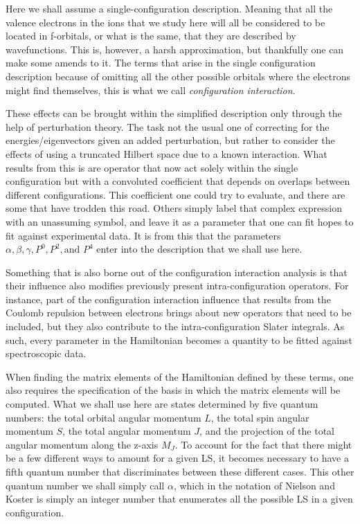 \documentclass{article}
\begin{document}
\begin{multicols}{2}
Here we shall assume a single-configuration description. Meaning that all the valence electrons in the ions that we study here will all be considered to be located in f-orbitals, or what is the same, that they are described by \fn wavefunctions. This is, however, a harsh approximation, but thankfully one can make some amends to it. The terms that arise in the single configuration description because of omitting all the other possible orbitals where the electrons might find themselves, this is what we call \textit{configuration interaction}. 

These effects can be brought within the simplified description only through the help of perturbation theory. The task not the usual one of correcting for the energies/eigenvectors given an added perturbation, but rather to consider the effects of using a truncated Hilbert space due to a known interaction. What results from this is are operator that now act solely within the single configuration but with a convoluted coefficient that depends on overlaps between different configurations. This  coefficient one could try to evaluate, and there are some that have trodden this road. Others simply label that complex expression with an unassuming symbol, and leave it as a parameter that one can fit hopes to fit against experimental data. It is from this that the parameters $\alpha, \beta, \gamma, P^0, P^2, \text{and } P^4$ enter into the description that we shall use here. 

Something that is also borne out of the configuration interaction analysis is that their influence also modifies previously present intra-configuration operators. For instance, part of the configuration interaction influence that results from the Coulomb repulsion between electrons brings about new operators that need to be included, but they also contribute to the intra-configuration Slater integrals. As such, every parameter in the Hamiltonian becomes a quantity to be fitted against spectroscopic data.

When finding the matrix elements of the Hamiltonian defined by these terms, one also requires the specification of the basis in which the matrix elements will be computed. What we shall use here are states determined by five quantum numbers: the total orbital angular momentum $L$, the total spin angular momentum $S$, the total angular momentum $J$, and the projection of the total angular momentum along the z-axis $M_J$. To account for the fact that there might be a few different ways to amount for a given LS, it becomes necessary to have a fifth quantum number that discriminates between these different cases. This other quantum number we shall simply call $\alpha$, which in the notation of Nielson and Koster is simply an integer number that enumerates all the possible LS in a given \fn configuration.

\end{multicols}
\end{document}
